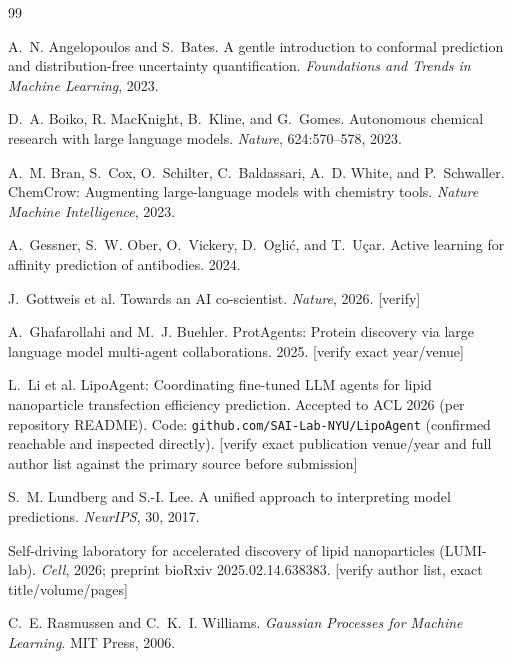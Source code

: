 \documentclass{article}
\begin{document}

\begin{thebibliography}{99}

 A.~N.
Angelopoulos and S.~Bates. A gentle introduction to conformal prediction
and distribution-free uncertainty quantification. \emph{Foundations and
Trends in Machine Learning}, 2023.

 D.~A. Boiko, R.
MacKnight, B.~Kline, and G.~Gomes. Autonomous chemical research with large
language models. \emph{Nature}, 624:570--578, 2023.

 A.~M. Bran, S.~Cox,
O.~Schilter, C.~Baldassari, A.~D. White, and P.~Schwaller. ChemCrow:
Augmenting large-language models with chemistry tools. \emph{Nature
Machine Intelligence}, 2023.

 A.~Gessner, S.~W. Ober,
O.~Vickery, D.~Ogli\'c, and T.~U\c{c}ar. Active learning for affinity
prediction of antibodies. 2024.

 J.~Gottweis et al. Towards
an AI co-scientist. \emph{Nature}, 2026. [verify]

 A.~Ghafarollahi
and M.~J. Buehler. ProtAgents: Protein discovery via large language model
multi-agent collaborations. 2025. [verify exact year/venue]

 L.~Li et al. LipoAgent:
Coordinating fine-tuned LLM agents for lipid nanoparticle transfection
efficiency prediction. Accepted to ACL 2026 (per repository README).
Code: \texttt{github.com/SAI-Lab-NYU/LipoAgent} (confirmed reachable and
inspected directly). [verify exact publication venue/year and full author
list against the primary source before submission]

 S.~M. Lundberg and S.-I.
Lee. A unified approach to interpreting model predictions. \emph{NeurIPS},
30, 2017.

 Self-driving laboratory for
accelerated discovery of lipid nanoparticles (LUMI-lab). \emph{Cell},
2026; preprint bioRxiv 2025.02.14.638383. [verify author list, exact
title/volume/pages]

 C.~E. Rasmussen and
C.~K.~I. Williams. \emph{Gaussian Processes for Machine Learning}. MIT
Press, 2006.


\end{thebibliography}
\end{document}
